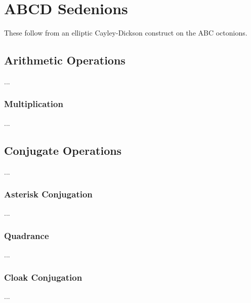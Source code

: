 \chapter{ABCD Sedenions}
These follow from an elliptic Cayley-Dickson construct on the ABC octonions.
\section{Arithmetic Operations}
...
\subsection{Multiplication}
...
\section{Conjugate Operations}
...
\subsection{Asterisk Conjugation}
...
\subsection{Quadrance}
...
\subsection{Cloak Conjugation}
...
